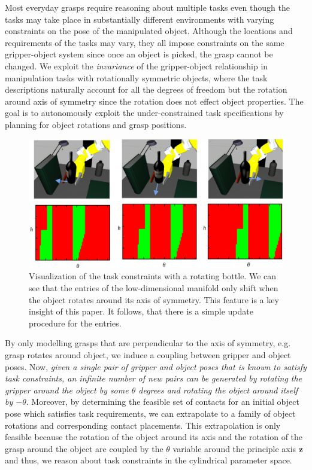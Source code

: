 \documentclass{aamas2015}
\begin{document}
Most everyday grasps require reasoning about multiple tasks even though the tasks may take place in substantially different environments with varying constraints on the pose of the manipulated
object. Although the locations and requirements of the tasks may vary, they all impose constraints 
on the same gripper-object system since once an object is picked, the grasp cannot be changed. 
We exploit the \textit{invariance} of the gripper-object relationship in manipulation tasks with 
rotationally symmetric objects, where the task descriptions naturally account for all the degrees 
of freedom but the rotation around axis of symmetry since the rotation does not effect object properties. The goal is to autonomously exploit the under-constrained task specifications by planning for object rotations and grasp positions. 
\begin{figure}[ht]
  \begin{center}
    \includegraphics[width=0.75\linewidth]{./images/rotatingWine.png} \quad
  \end{center}
   \caption{Visualization of the task constraints with a rotating bottle. We can see that the entries of the low-dimensional manifold only shift when the object rotates around its axis of symmetry. This feature is a key insight of this paper. It follows, that there is a simple update procedure for the entries.}
  \label{fig:rotatingwine} 
\end{figure}
By only modelling grasps that are perpendicular to the axis of symmetry, e.g. grasp rotates around object, we induce a coupling between gripper and object poses. Now, \textit{given a single pair of gripper and object poses that is known to satisfy task constraints, an infinite number of new pairs can be generated by rotating the gripper around the object by some $\theta$ degrees and rotating the object around itself by $-\theta$}. Moreover, by determining the feasible set of contacts for an initial object
pose which satisfies task requirements, we can extrapolate to a family of object rotations and corresponding contact placements. This extrapolation is only feasible because the rotation of the object around its axis and the rotation of the grasp around the object are coupled by the $\theta$ variable around the principle axis $\textbf{z}$ and thus, we reason about task
constraints in the cylindrical parameter space.
\end{document}
